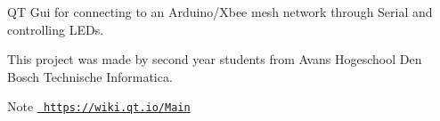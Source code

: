 QT Gui for connecting to an Arduino/\+Xbee mesh network through Serial and controlling L\+ED\textquotesingle{}s.

This project was made by second year students from Avans Hogeschool Den Bosch Technische Informatica.

\begin{DoxyNote}{Note}
\href{https://wiki.qt.io/Main}{\texttt{ https\+://wiki.\+qt.\+io/\+Main}} 
\end{DoxyNote}
